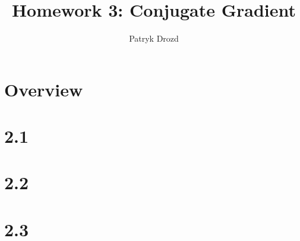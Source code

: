 \documentclass[a4paper]{article}
\title{Homework 3: Conjugate Gradient}
\author{Patryk Drozd}
\begin{document}
\date{}
\maketitle

\section*{Overview}

\section*{2.1}
\section*{2.2}
	

\section*{2.3}
\end{document}
